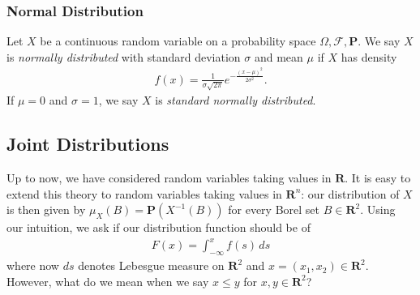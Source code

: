 \subsubsection{Normal Distribution}
\begin{definition}
	Let $X$ be a continuous random variable on a probability space $\Omega, 
	\mathcal{F},
	\mathbf{P}$. We say $X$ is \emph{normally distributed} with standard deviation 
	$\sigma$ and
	mean $\mu$ if $X$ has density
	\begin{align*}
		f(x) = \frac{1}{\sigma \sqrt{2 \pi}} e^{-\frac{{(x - \mu)}^2}{2 
		\sigma^2}}.
	\end{align*}
	If $\mu = 0$ and $\sigma =1$, we say $X$ is \emph{standard normally
	distributed}.
\end{definition}
\subsection{Joint Distributions}
Up to now, we have considered random variables taking values in $\mathbf{R}$.
It is easy to extend this theory to random variables taking values in $\mathbf{R}^n$:
our distribution of $X$ is then given by $\mu_X(B) =
\mathbf{P}(X^{-1}(B))$ for every Borel set $B \in
\mathbf{R}^2$. Using our intuition, we ask if our distribution function should be of
\begin{align*}
	F(x) = \int_{-\infty}^{x} f(s) \, ds
\end{align*}
where now $ds$ denotes Lebesgue measure on $\mathbf{R}^2$ and $x = (x_1, x_2) \in
\mathbf{R}^2$. However, what do we mean when we say $x \le y$ for $x, y \in \mathbf{R}^2$? 

